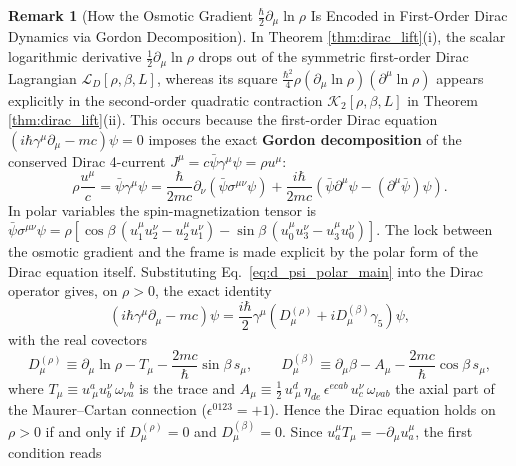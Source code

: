 \documentclass[11pt, a4paper]{article}
\theoremstyle{definition}
\newtheorem{remark}[theorem]{Remark}
\begin{document}
\begin{remark}[How the Osmotic Gradient $\frac{\hbar}{2}\partial_\mu\ln\rho$ Is Encoded in First-Order Dirac Dynamics via Gordon Decomposition]
\label{rem:gordon_osmotic_bridge}
In Theorem \ref{thm:dirac_lift}(i), the scalar logarithmic derivative $\frac{1}{2}\partial_\mu\ln\rho$ drops out of the symmetric first-order Dirac Lagrangian $\mathcal{L}_D[\rho, \beta, L]$, whereas its square $\frac{\hbar^2}{4}\rho(\partial_\mu\ln\rho)(\partial^\mu\ln\rho)$ appears explicitly in the second-order quadratic contraction $\mathcal{K}_2[\rho, \beta, L]$ in Theorem \ref{thm:dirac_lift}(ii). This occurs because the first-order Dirac equation $(i\hbar\gamma^\mu\partial_\mu - mc)\psi = 0$ imposes the exact \textbf{Gordon decomposition} of the conserved Dirac 4-current $J^\mu = c\bar{\psi}\gamma^\mu\psi = \rho u^\mu$:
\begin{equation}
\label{eq:gordon_decomp}
\rho \frac{u^\mu}{c} = \bar{\psi}\gamma^\mu\psi = \frac{\hbar}{2mc}\partial_\nu \left(\bar{\psi}\sigma^{\mu\nu}\psi\right) + \frac{i\hbar}{2mc}\left( \bar{\psi}\partial^\mu\psi - (\partial^\mu\bar{\psi})\psi \right).
\end{equation}
In polar variables the spin-magnetization tensor is $\bar{\psi}\sigma^{\mu\nu}\psi = \rho\left[\cos\beta\,(u_1^\mu u_2^\nu - u_2^\mu u_1^\nu) - \sin\beta\,(u_0^\mu u_3^\nu - u_3^\mu u_0^\nu)\right]$. The lock between the osmotic gradient and the frame is made explicit by the polar form of the Dirac equation itself. Substituting Eq.~\eqref{eq:d_psi_polar_main} into the Dirac operator gives, on $\rho > 0$, the exact identity
\begin{equation}
\label{eq:polar_dirac_residual}
(i\hbar\gamma^\mu\partial_\mu - mc)\psi = \frac{i\hbar}{2}\gamma^\mu\left( D_\mu^{(\rho)} + i D_\mu^{(\beta)}\gamma_5 \right)\psi,
\end{equation}
with the real covectors
\begin{equation}
\label{eq:polar_dirac_pair}
D_\mu^{(\rho)} \equiv \partial_\mu\ln\rho - T_\mu - \frac{2mc}{\hbar}\sin\beta\, s_\mu, \qquad
D_\mu^{(\beta)} \equiv \partial_\mu\beta - A_\mu - \frac{2mc}{\hbar}\cos\beta\, s_\mu,
\end{equation}
where $T_\mu \equiv u^a_{\ \mu}u_b^\nu\,\omega_{\nu a}^{\ \ \, b}$ is the trace and $A_\mu \equiv \frac{1}{2}\,u^d_{\ \mu}\,\eta_{de}\,\epsilon^{ecab}\,u_c^\nu\,\omega_{\nu ab}$ the axial part of the Maurer--Cartan connection ($\epsilon^{0123} = +1$). Hence the Dirac equation holds on $\rho > 0$ if and only if $D_\mu^{(\rho)} = 0$ and $D_\mu^{(\beta)} = 0$. Since $u_a^\mu T_\mu = -\partial_\mu u_a^\mu$, the first condition reads

\end{remark}
\end{document}
